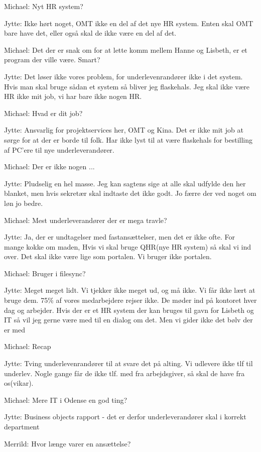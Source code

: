 \begin{linenumbers*}
Michael:
Nyt HR system?

Jytte:
Ikke hørt noget, OMT ikke en del af det nye HR system.
Enten skal OMT bare have det, eller også skal de ikke være en del af det.

Michael:
Det der er snak om for at lette komm mellem Hanne og Lisbeth,
er et program der ville være. Smart?

Jytte:
Det løser ikke vores problem, for underlevenrandører ikke i det system.
Hvis man skal bruge sådan et system så bliver jeg flaskehals.
Jeg skal ikke være HR ikke mit job, vi har bare ikke nogen HR. 

Michael:
Hvad er dit job?

Jytte:
Ansvarlig for projektservices her, OMT og Kina.
Det er ikke mit job at sørge for at der er borde til folk.
Har ikke lyst til at være flaskehals for bestilling af PC’ere til nye underleverandører. 

Michael:
Der er ikke nogen ...

Jytte:
Pludselig en hel masse. Jeg kan sagtens sige at alle skal udfylde den her blanket,
men hvis sekretær skal indtaste det ikke godt. Jo færre der ved noget om løn jo bedre.

Michael:
Mest underleverandører der er mega travle?

Jytte:
Ja, der er undtagelser med fastansættelser, men det er ikke ofte.
For mange kokke om maden, 
Hvis vi skal bruge QHR(nye HR system) så skal vi ind over.
Det skal ikke være lige som portalen. Vi bruger ikke portalen.
 
Michael:
Bruger i filesync?

Jytte:
Meget meget lidt. Vi tjekker ikke meget ud, og må ikke.
Vi får ikke lært at bruge dem.
75\% af vores medarbejdere rejser ikke. De møder ind på kontoret hver dag og arbejder.
Hvis der er et HR system der kan bruges til gavn for Lisbeth og IT
så vil jeg gerne være med til en dialog om det. 
Men vi gider ikke det bølv der er med 

Michael:
Recap

Jytte:
Tving underlevenrandører til at svare det på alting.
Vi udlevere ikke tlf til underlev.
Nogle gange får de ikke tlf. med fra arbejdsgiver, så skal de have fra os(vikar).

Michael:
Mere IT i Odense en god ting?

Jytte:
Business objects rapport - det er derfor underleverandører skal i korrekt department

Merrild:
Hvor længe varer en ansættelse?


\end{linenumbers*}
